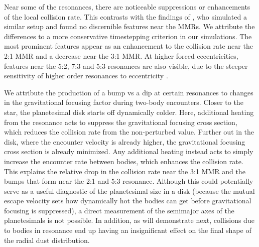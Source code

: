\documentclass[twocolumn]{aastex63}
\begin{document}
Near some of the resonances, there are noticeable suppressions or enhancements of the local collision rate. This contrasts with the findings of 
\citet{2000Icar..143...45R}, who simulated a similar setup and found no discernible features near the MMRs. We attribute the differences to  a more 
conservative timestepping criterion in our simulations. The most prominent features appear as an enhancement to the collision rate near the 2:1 
MMR and a decrease near the 3:1 MMR. At higher forced eccentricities, features near the 5:2, 7:3 and 5:3 resonances are also visible, due to the 
steeper sensitivity of higher order resonances to eccentricity \citep{1994PhyD...77..289M}.

We attribute the production of a bump vs a dip at certain resonances to changes in the gravitational focusing factor during two-body encounters. 
Closer to the star, the planetesimal disk starts off dynamically colder. Here, additional heating from the resonance acts to suppress the gravitational 
focusing cross section, which reduces the collision rate from the non-perturbed value. Further out in the disk, where the encounter velocity is already 
higher, the gravitational focusing cross section is already minimized. Any additional heating instead acts to simply increase the encounter rate 
between bodies, which enhances the collision rate. This explains the relative drop in the collision rate near the 3:1 MMR and the bumps that form 
near the 2:1 and 5:3 resonance. Although this could potentially serve as a useful diagnostic of the planetesimal size in a disk (because the mutual 
escape velocity sets how dynamically hot the bodies can get before gravitational focusing is suppressed), a direct measurement of the semimajor 
axes of the planetesimals is not possible. In addition, as will demonstrate next, collisions due to bodies in resonance end up having an insignificant 
effect on the final shape of the radial dust distribution.
\end{document}
